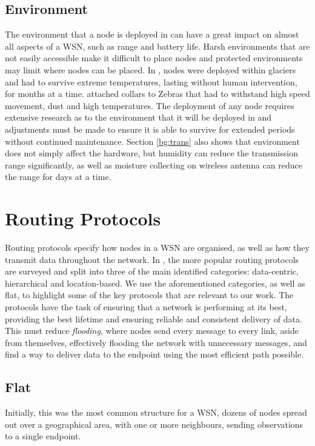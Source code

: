 \subsection{Environment}
	The environment that a node is deployed in can have a great impact on almost all aspects of a WSN, such as range and battery life. Harsh environments that are not easily accessible make it difficult to place nodes and protected environments may limit where nodes can be placed. 
	In \cite{Martinez2004}, nodes were deployed within glaciers and had to survive extreme temperatures, lasting without human intervention, for months at a time. \cite{Juang2002} attached collars to Zebras that had to withstand high speed movement, dust and high temperatures. The deployment of any node requires extensive research as to the environment that it will be deployed in and adjustments must be made to ensure it is able to survive for extended periods without continued maintenance.
	Section \ref{bg:trans} also shows that environment does not simply affect the hardware, but humidity can reduce the transmission range significantly, as well as moisture collecting on wireless antenna can reduce the range for days at a time.

\section{Routing Protocols} \label{bg:rp} 
	Routing protocols specify how nodes in a WSN are organised, as well as how they transmit data throughout the network. In \cite{Akkaya2005}, the more popular routing protocols are surveyed and split into three of the main identified categories: data-centric, hierarchical and location-based. We use the aforementioned categories, as well as flat, to highlight some of the key protocols that are relevant to our work.
	The protocols have the task of ensuring that a network is performing at its best, providing the best lifetime and ensuring reliable and consistent delivery of data. This must reduce \textit{flooding}, where nodes send every message to every link, aside from themselves, effectively flooding the network with unnecessary messages, and find a way to deliver data to the endpoint using the most efficient path possible.

\subsection{Flat}
	Initially, this was the most common structure for a WSN, dozens of nodes spread out over a geographical area, with one or more neighbours, sending observations to a single endpoint.


